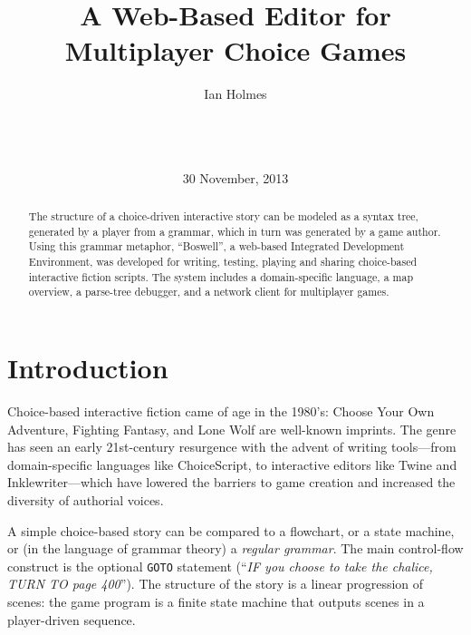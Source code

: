 \documentclass{acm_proc_article-sp}
\begin{document}
\title{A Web-Based Editor for Multiplayer Choice Games}
\author{
\alignauthor
Ian Holmes\\
       \\
       \\
       \\
}
\date{30 November, 2013}

\maketitle
\begin{abstract}
The structure of a choice-driven interactive story can be modeled as a syntax tree, generated by a player
 from a grammar, which in turn was generated by a game author.
Using this grammar metaphor, ``Boswell'',
 a web-based Integrated Development Environment,
 was developed for writing, testing, playing and sharing choice-based interactive fiction scripts.
The system includes a domain-specific language,
 a map overview, a parse-tree debugger, and a network client for multiplayer games.
\end{abstract}



\section{Introduction}

Choice-based interactive fiction came of age in the 1980's:
Choose Your Own Adventure\cite{packard1982cave}, Fighting Fantasy\cite{jackson1982warlock},
and Lone Wolf are well-known imprints.
The genre has seen an early 21st-century resurgence with the advent of writing
tools---from domain-specific languages like ChoiceScript\cite{ChoiceScript},
to interactive editors like Twine\cite{Twine} and Inklewriter\cite{Inklewriter}---which
have lowered the barriers to game creation and increased the diversity of authorial voices.

A simple choice-based story can be compared to a flowchart, or a state machine,
or (in the language of grammar theory) a {\em regular grammar}.
The main control-flow construct is the optional {\tt GOTO} statement
(``{\em IF you choose to take the chalice, TURN TO page 400}'').
The structure of the story is a linear progression of scenes:
 the game program is a finite state machine that outputs scenes in a player-driven sequence.
\end{document}
